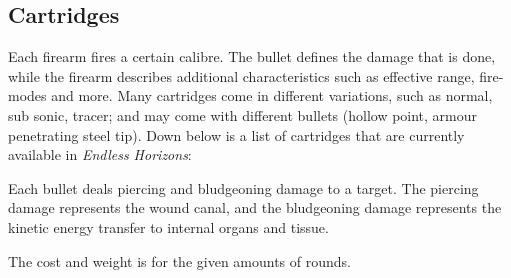 \subsection{Cartridges}
\label{sub:10-Cartridges}

Each firearm fires a certain calibre. The bullet defines the damage that is
done, while the firearm describes additional characteristics such as effective
range, fire-modes and more. Many cartridges come in different variations, such
as normal, sub sonic, tracer; and may come with different bullets (hollow
point, armour penetrating steel tip). Down below is a list of cartridges that
are currently available in \emph{Endless Horizons}:

Each bullet deals piercing and bludgeoning damage to a target. The piercing
damage represents the wound canal, and the bludgeoning damage represents the
kinetic energy transfer to internal organs and tissue.

The cost and weight is for the given amounts of rounds.

